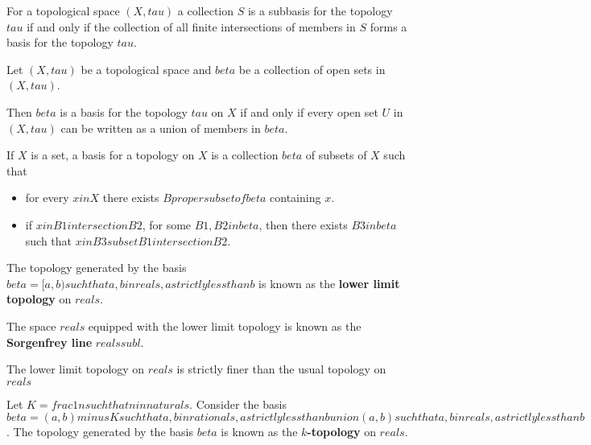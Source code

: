 \begin{note}
    For a topological space $(X, tau)$ a collection $S$ is a subbasis for the topology $tau$ if and only if the collection of all finite intersections of members in $S$ forms a basis for the topology $tau$.
\end{note}

\begin{thm}
    Let $(X, tau)$ be a topological space and $beta$ be a collection of open sets in $(X, tau)$.

    Then $beta$ is a basis for the topology $tau$ on $X$ if and only if every open set $U$ in $(X, tau)$ can be written as a union of members in $beta$.
\end{thm}

\begin{thm}
    If $X$ is a set, a basis for a topology on $X$ is a collection $beta$ of subsets of $X$ such that 
    \begin{itemize}
        \item for every $x in X$ there exists $B proper subset of beta$ containing $x$.
        \item if $x in B1 intersection B2$, for some $B1, B2 in beta$, then there exists $B3 in beta$ such that $x in B3 subset B1 intersection B2$.
    \end{itemize}
\end{thm}

\begin{defn}
    The topology generated by the basis $beta = {{ [a, b) such that a, b in reals, a strictly less than b }}$ is known as the \textbf{lower limit topology} on $reals$. 

    The space $reals$ equipped with the lower limit topology is known as the \textbf{Sorgenfrey line} $reals sub l$.
\end{defn}

\begin{prop}
    The lower limit topology on $reals$ is strictly finer than the usual topology on $reals$
\end{prop}

\begin{defn}
    Let $K = {{ frac{1}{n} such that n in naturals }}$. Consider the basis \\ $beta = {{ (a, b) minus K such that a,b in rationals, a strictly less than b }} union {{ (a,b) such that a,b in reals, a strictly less than b }}$.  The topology generated by the basis $beta$ is known as the \textbf{$k$-topology} on $reals$.
\end{defn}

